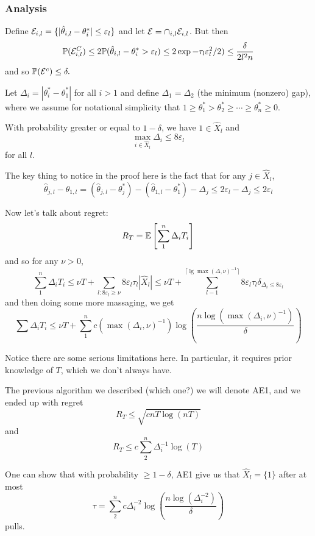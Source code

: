 \documentclass[12pt]{article}
\begin{document}
\subsubsection{Analysis}
Define $\mathcal{E}_{i,l}=\{|\hat\theta_{i,l}-\theta_i^\ast|\le\varepsilon_l\}$ and let $\mathcal{E}=\cap_{i,l}\mathcal{E}_{i,l}$. But then 
\[\mathbb{P}(\mathcal{E}_{i,l}^C)\le 2\mathbb{P}(\hat\theta_{i,l}-\theta_i^\ast>\varepsilon_l)\le 2\exp{-\tau_l\varepsilon^2_l/2)}\le\frac{\delta}{2l^2n}\]
and so $\mathbb{P}(\mathcal{E}^c)\le\delta.$

\begin{defn}
	Let $\Delta_i=|\theta_i^\ast-\theta_1^\ast|$ for all $i>1$ and define $\Delta_1=\Delta_2$ (the minimum (nonzero) gap), where we assume for notational simplicity that $1\ge\theta_1^\ast>\theta_2^\ast\ge\cdots\ge\theta_n^\ast\ge 0$.
\end{defn}
\begin{lem}
	With probability greater or equal to $1-\delta$, we have $1\in\hat X_l$ and 
	\[\max_{i\in\hat X_l}\Delta_i\le 8\varepsilon_l\]
	for all $l$.
\end{lem}
\begin{rmk}
	The key thing to notice in the proof here is the fact that for any $j\in\hat X_l$,
	\[\hat\theta_{j,l}-\hat\theta_{1,l}=(\hat\theta_{j,l}-\theta_j^\ast)-(\hat\theta_{1,l}-\theta_1^\ast)-\Delta_j\le 2\varepsilon_l-\Delta_j\le 2\varepsilon_l\]
\end{rmk}

Now let's talk about regret:
\[R_T=\mathbb{E}\left[\sum_1^n\Delta_i T_i\right]\]
and so for any $\nu>0$,
\[\sum_1^n\Delta_iT_i\le \nu T+\sum_{l:8\varepsilon_l\ge \nu}8\varepsilon_l\tau_l|\hat X_l|\le \nu T+\sum_{l-1}^{\lceil\lg\max(\Delta,\nu)^{-1}\rceil}8\varepsilon_l\tau_l\delta_{\Delta_i\le 8\varepsilon_l}\]
and then doing some more massaging, we get 
\[\sum\Delta_iT_i\le \nu T+\sum_1^n c(\max(\Delta_i,\nu)^{-1})\log\left(\frac{n\log(\max(\Delta_i,\nu)^{-1})}{\delta}\right)\]

\begin{rmk}
	Notice there are some serious limitations here. In particular, it requires prior knowledge of $T$, which we don't always have.
\end{rmk}

The previous algorithm we described (which one?) we will denote AE1, and we ended up with regret 
\[R_T\le\sqrt{cnT\log(nT)}\]
and 
\[R_T\le c\sum_2^n\Delta_i^{-1}\log(T)\]

One can show that with probability $\ge 1-\delta$, AE1 give us that $\hat X_l=\{1\}$ after at most 
\[\tau=\sum_2^n c\Delta_i^{-2}\log\left(\frac{n\log(\Delta_i^{-2})}{\delta}\right)\]
pulls.
\end{document}
